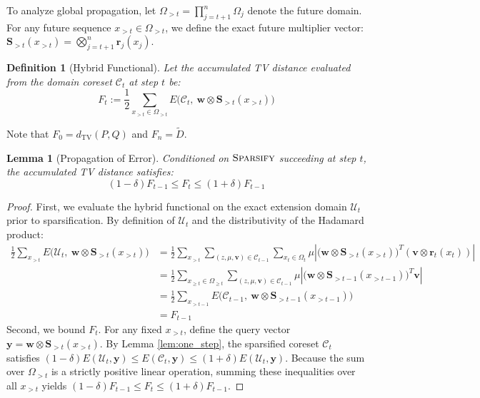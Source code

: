 \documentclass{article}
\newtheorem{definition}{Definition}[section]
\newtheorem{lemma}{Lemma}[section]
\begin{document}
To analyze global propagation, let $\Omega_{>t} = \prod_{j=t+1}^n \Omega_j$ denote the future domain. For any future sequence $x_{>t} \in \Omega_{>t}$, we define the exact future multiplier vector: $\mathbf{S}_{>t}(x_{>t}) = \bigotimes_{j=t+1}^n \mathbf{r}_j(x_j)$.

\begin{definition}[Hybrid Functional]
Let the accumulated TV distance evaluated from the domain coreset $\mathcal{C}_t$ at step $t$ be:
\begin{equation}
    F_t := \frac{1}{2} \sum_{x_{>t} \in \Omega_{>t}} E\Big(\mathcal{C}_t, \ \mathbf{w} \otimes \mathbf{S}_{>t}(x_{>t})\Big)
\end{equation}
\end{definition}
Note that $F_0 = d_{\mathrm{TV}}(P, Q)$ and $F_n = \tilde{D}$.

\begin{lemma}[Propagation of Error]
\label{lem:propagation}
Conditioned on $\textsc{Sparsify}$ succeeding at step $t$, the accumulated TV distance satisfies:
\begin{equation}
    (1 - \delta) F_{t-1} \le F_t \le (1 + \delta) F_{t-1}
\end{equation}
\end{lemma}
\begin{proof}
First, we evaluate the hybrid functional on the exact extension domain $\mathcal{U}_t$ prior to sparsification. By definition of $\mathcal{U}_t$ and the distributivity of the Hadamard product:
\begin{align}
    \frac{1}{2} \sum_{x_{>t}} E\Big(\mathcal{U}_t, \ \mathbf{w} \otimes \mathbf{S}_{>t}(x_{>t})\Big) 
    &= \frac{1}{2} \sum_{x_{>t}} \sum_{(z, \mu, \mathbf{v}) \in \mathcal{C}_{t-1}} \sum_{x_t \in \Omega_t} \mu \left| \big(\mathbf{w} \otimes \mathbf{S}_{>t}(x_{>t})\big)^T (\mathbf{v} \otimes \mathbf{r}_t(x_t)) \right| \nonumber \\
    &= \frac{1}{2} \sum_{x_{\ge t} \in \Omega_{\ge t}} \sum_{(z, \mu, \mathbf{v}) \in \mathcal{C}_{t-1}} \mu \left| \big(\mathbf{w} \otimes \mathbf{S}_{>t-1}(x_{>t-1})\big)^T \mathbf{v} \right| \nonumber \\
    &= \frac{1}{2} \sum_{x_{>t-1}} E\Big(\mathcal{C}_{t-1}, \ \mathbf{w} \otimes \mathbf{S}_{>t-1}(x_{>t-1})\Big) \nonumber \\
    &= F_{t-1}
\end{align}
Second, we bound $F_t$. For any fixed $x_{>t}$, define the query vector $\mathbf{y} = \mathbf{w} \otimes \mathbf{S}_{>t}(x_{>t})$. By Lemma \ref{lem:one_step}, the sparsified coreset $\mathcal{C}_t$ satisfies $(1 - \delta) E(\mathcal{U}_t, \mathbf{y}) \le E(\mathcal{C}_t, \mathbf{y}) \le (1 + \delta) E(\mathcal{U}_t, \mathbf{y})$. Because the sum over $\Omega_{>t}$ is a strictly positive linear operation, summing these inequalities over all $x_{>t}$ yields $(1-\delta) F_{t-1} \le F_t \le (1+\delta) F_{t-1}$.
\end{proof}
\end{document}
